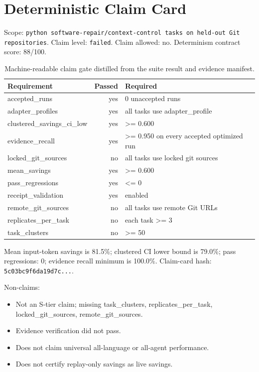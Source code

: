 \section{Deterministic Claim Card}
Scope: \texttt{python software-repair/context-control tasks on held-out Git repositories}. Claim level: \texttt{failed}. Claim allowed: no. Determinism contract score: 88/100.

\begin{table}[h]
\centering
\begin{tabular}{lrl}
\toprule
Requirement & Passed & Required \\
\midrule
accepted\_runs & yes & 0 unaccepted runs \\
adapter\_profiles & yes & all tasks use adapter\_profile \\
clustered\_savings\_ci\_low & yes & >= 0.600 \\
evidence\_recall & yes & >= 0.950 on every accepted optimized run \\
locked\_git\_sources & no & all tasks use locked git sources \\
mean\_savings & yes & >= 0.600 \\
pass\_regressions & yes & <= 0 \\
receipt\_validation & yes & enabled \\
remote\_git\_sources & no & all tasks use remote Git URLs \\
replicates\_per\_task & no & each task >= 3 \\
task\_clusters & no & >= 50 \\
\bottomrule
\end{tabular}
\caption{Machine-readable claim gate distilled from the suite result and evidence manifest.}
\end{table}

Mean input-token savings is 81.5\%; clustered CI lower bound is 79.0\%; pass regressions: 0; evidence recall minimum is 100.0\%. Claim-card hash: \texttt{5c03bc9f6da19d7c...}.

\noindent Non-claims:
\begin{itemize}
\item Not an S-tier claim; missing task\_clusters, replicates\_per\_task, locked\_git\_sources, remote\_git\_sources.
\item Evidence verification did not pass.
\item Does not claim universal all-language or all-agent performance.
\item Does not certify replay-only savings as live savings.
\end{itemize}
